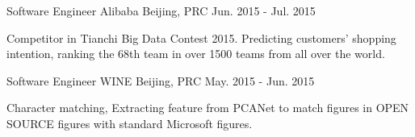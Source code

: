 \begin{cventries}

\cventry
{Software Engineer} %
{Alibaba} %
{Beijing, PRC} %
{Jun. 2015 - Jul. 2015} %
{ %
\begin{cvitems}
\item {Competitor in Tianchi Big Data Contest 2015. Predicting customers’ shopping intention, ranking the 68th team in over 1500 teams from all over the world.}
\end{cvitems}
}


\cventry
{Software Engineer} %
{WINE} %
{Beijing, PRC} %
{May. 2015 - Jun. 2015} %
{ %
\begin{cvitems}
\item {Character matching, Extracting feature from PCANet to match figures in OPEN SOURCE figures with standard Microsoft figures.}
\end{cvitems}
}


\end{cventries}
